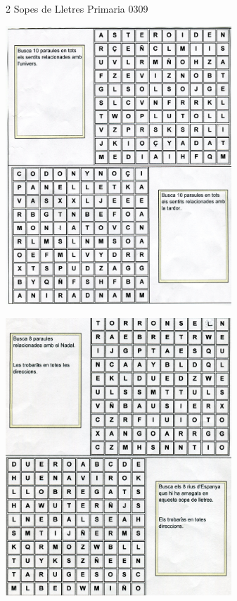 \begin{news}
{2} %
{Sopes de Lletres}
{}
{Primaria}
{0309} %


\noindent\includegraphics[width=8.5cm,keepaspectratio]{primaria/img/sopa_img009.jpg}

\noindent\includegraphics[width=8.5cm,keepaspectratio]{primaria/img/sopa_img010.jpg}
  
\end{news}
